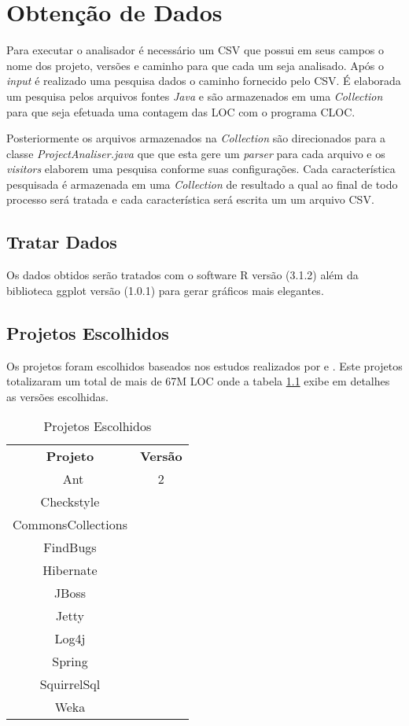 \chapter{Obtenção de Dados}

Para executar o analisador é necessário um \acs{CSV} que possui em seus campos o nome dos projeto, versões e caminho para que cada um seja analisado. Após o {\it input} é realizado uma pesquisa dados o caminho fornecido pelo \acs{CSV}.
É elaborada um pesquisa pelos arquivos fontes \textit{Java} e são armazenados em uma \textit{Collection} para que seja efetuada uma contagem das \acs{LOC} com o programa \acs{CLOC}.

Posteriormente os arquivos armazenados na \textit{Collection} são direcionados para a classe \textit{ProjectAnaliser.java} que que esta gere um \textit{parser} para cada arquivo e os \textit{visitors} elaborem uma pesquisa conforme suas configurações. Cada característica pesquisada é armazenada em uma \textit{Collection} de resultado a qual ao final de todo processo será tratada e cada característica será escrita um um arquivo \acs{CSV}.


\section{Tratar Dados}
Os dados obtidos serão tratados com o software R \cite{R} versão (3.1.2) além da biblioteca ggplot \cite{ggplot} versão (1.0.1) para gerar gráficos mais elegantes.


\section{Projetos Escolhidos}
Os projetos foram escolhidos baseados nos estudos realizados por \cite{Parnin:2011:JGA:1985441.1985446} e \cite{Dyer:2014:MBA:2568225.2568295}. Este projetos totalizaram um total de mais de 67M \acs{LOC} onde a tabela \ref{tab:ProjetosEscolhidos} exibe em detalhes as versões escolhidas.


\begin{table}[ht]
	\centering
	\caption{Projetos Escolhidos}
	\label{tab:ProjetosEscolhidos}
	\begin{tabular}{c|c}
		\hline \hline
		\textbf{Projeto}    &   \textbf{Versão}\\ \
	      Ant & 2 \\
	      Checkstyle &  \\
	      CommonsCollections &  \\
	      FindBugs &  \\
	      Hibernate & \\
	      JBoss & \\
	      Jetty & \\
	      Log4j & \\
	      Spring & \\
	      SquirrelSql & \\
	      Weka & \\
      \hline
    \end{tabular}
\end{table}